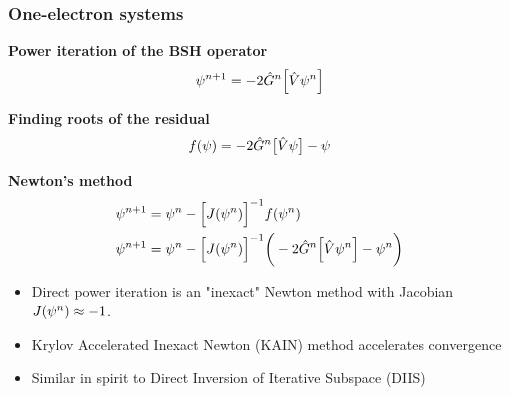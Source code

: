 \begin{frame}
  \frametitle{One-electron systems}
  \centering
  \textbf{Power iteration of the BSH operator}
  \begin{equation}
    \psi^{n+1} = -2\hat{G}^n\Big[\hat{V} \psi^n\Big]
  \end{equation}

  \vspace{3mm}

  \textbf{Finding roots of the residual}
  \begin{equation}
    f(\psi) = -2\hat{G}^n\big[\hat{V} \psi\big] - \psi
  \end{equation}

  \vspace{3mm}

  \textbf{Newton's method}
  \begin{align}
    \psi^{n+1} &= \psi^n - \Big[J(\psi^n)\Big]^{-1} f(\psi^n)\\
    \psi^{n+1} &= \psi^n - \Big[J(\psi^n)\Big]^{-1}
    \bigg(-2\hat{G}^n\Big[\hat{V} \psi^n\Big] - \psi^n\bigg)
  \end{align}

  \vspace{3mm}

  \begin{itemize}
    \item Direct power iteration is an "inexact" Newton method with Jacobian $J(\psi^n) \approx -1$.
    \item Krylov Accelerated Inexact Newton (KAIN) method accelerates convergence
    \item Similar in spirit to Direct Inversion of Iterative Subspace (DIIS)
  \end{itemize}
\end{frame}

